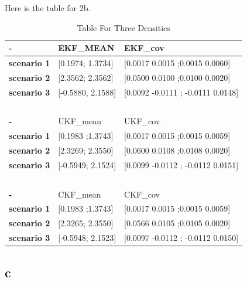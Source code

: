 Here is the table for 2b.
\begin{table}[H]
    \raggedleft
    \begin{tabular}{|l|l|l|}
    \hline
        \textbf{-} & \textbf{EKF\_MEAN} & \textbf{EKF\_cov} \\ \hline
        \textbf{scenario 1} & [0.1974; 1.3734] & [0.0017    0.0015 ;0.0015    0.0060] \\ \hline
        \textbf{scenario 2} & [2.3562; 2.3562] & [0.0500    0.0100 ;0.0100    0.0020] \\ \hline
        \textbf{scenario 3} & [-0.5880, 2.1588] & [0.0092   -0.0111 ; -0.0111    0.0148] \\ \hline
        \textbf{} & ~ & ~ \\ \hline
        \textbf{-} & UKF\_mean & UKF\_cov \\ \hline
        \textbf{scenario 1} & [0.1983 ;1.3743] & [0.0017    0.0015 ;0.0015    0.0059] \\ \hline
        \textbf{scenario 2} & [2.3269; 2.3550] & [0.0600    0.0108 ;0.0108    0.0020] \\ \hline
        \textbf{scenario 3} & [-0.5949; 2.1524] & [0.0099   -0.0112 ; -0.0112    0.0151] \\ \hline
        \textbf{} & ~ & ~ \\ \hline
        \textbf{-} & CKF\_mean & CKF\_cov \\ \hline
        \textbf{scenario 1} & [0.1983 ;1.3743] & [0.0017    0.0015 ;0.0015    0.0059] \\ \hline
        \textbf{scenario 2} & [2.3265; 2.3550] & [0.0566    0.0105 ;0.0105    0.0020] \\ \hline
        \textbf{scenario 3} & [-0.5948; 2.1523] & [0.0097   -0.0112 ; -0.0112    0.0150] \\ \hline
    \end{tabular}
    \caption{Table For Three Densities}
\end{table}

\subsection{c}

